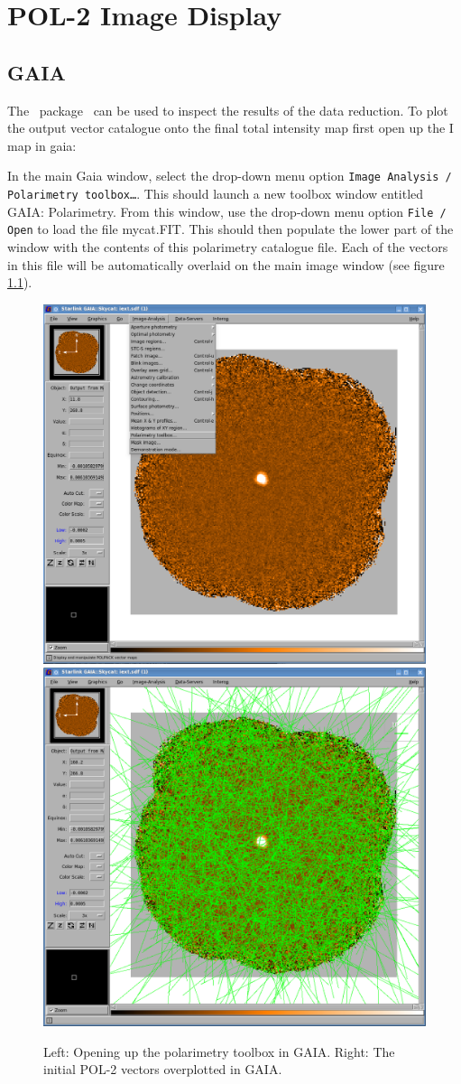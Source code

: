 \chapter{POL-2 Image Display}
\label{sec:display}

\section{GAIA}

The \starlink\ package \gaia\ can be used to inspect the results of the data reduction.
To plot the output vector catalogue onto the final total intensity map
first open up the I map in gaia:

\begin{terminalv}
\end{terminalv}


In the main Gaia window, select the drop-down menu option \texttt{Image Analysis /
Polarimetry toolbox…}. This should launch a new toolbox window entitled
GAIA: Polarimetry. From this window, use the drop-down menu option
\texttt{File / Open} to load the file mycat.FIT. This should then populate the lower part of the
window with the contents of this polarimetry catalogue file.
Each of the vectors in this file will be automatically overlaid on the main image window
(see figure \ref{fig:gaia-plot-vectors1}).

\begin{figure}[t!]
\begin{center}
\includegraphics[width=0.46\linewidth]{sc22-gaia-plot-vectors-1.png}
\includegraphics[width=0.46\linewidth]{sc22-gaia-plot-vectors-3.png}
\label{fig:gaia-plot-vectors1}
\caption [Over Plotting Vectors in GAIA]{
  \small Left: Opening up the polarimetry toolbox in GAIA. Right: The initial POL-2
vectors overplotted in GAIA.
}
\end{center}
\end{figure}

